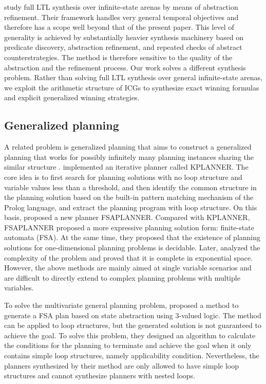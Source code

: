 \documentclass[review]{elsarticle}
\begin{document}
\citet{AzzopardiPDS2025} study full LTL synthesis over infinite-state arenas by means of abstraction refinement.
Their framework handles very general temporal objectives and therefore has a scope well beyond that of the present paper.
This level of generality is achieved by substantially heavier synthesis machinery based on predicate discovery, abstraction refinement, and repeated checks of abstract counterstrategies.
The method is therefore sensitive to the quality of the abstraction and the refinement process.
Our work solves a different synthesis problem.
Rather than solving full LTL synthesis over general infinite-state arenas, we exploit the arithmetic structure of ICGs to synthesize exact winning formulas and explicit generalized winning strategies.


\subsection{Generalized planning} 
A related problem is generalized planning that aims to construct a generalized planning that works for possibly infinitely many planning instances sharing the similar structure \cite{Lev2005}.
\citet{Lev2005} implemented an iterative planner called KPLANNER. 
The core idea is to first search for planning solutions with no loop structure and variable values less than a threshold, and then identify the common structure in the planning solution based on the built-in pattern matching mechanism of the Prolog language, and extract the planning program with loop structure. 
On this basis, \citet{HuL2010} proposed a new planner FSAPLANNER. Compared with KPLANNER, FSAPLANNER proposed a more expressive planning solution form: finite-state automata (FSA). 
At the same time, they proposed that the existence of planning solutions for one-dimensional planning problems is decidable. 
Later, \citet{HuG2011} analyzed the complexity of the problem and proved that it is complete in exponential space. 
However, the above methods are mainly aimed at single variable scenarios and are difficult to directly extend to complex planning problems with multiple variables.

To solve the multivariate general planning problem, \citet{SriIZ2011} proposed a method to generate a FSA plan based on state abstraction using 3-valued logic. 
The method can be applied to loop structures, but the generated solution is not guaranteed to achieve the goal. 
To solve this problem, they designed an algorithm to calculate the conditions for the planning to terminate and achieve the goal when it only contains simple loop structures, namely applicability
condition\cite{SriIZ2012}. 
Nevertheless, the planners synthesized by their method are only allowed to have simple loop structures and cannot synthesize planners with nested loops.
\end{document}
